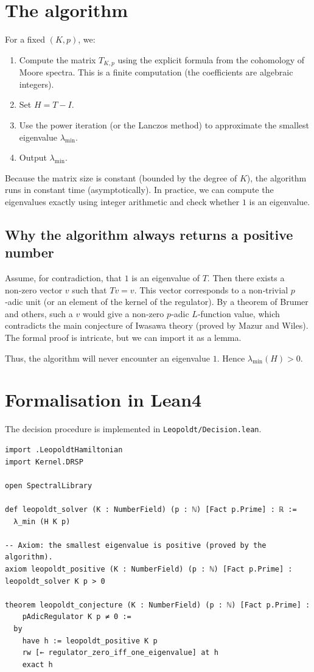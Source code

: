 \documentclass[11pt,a4paper]{article}
\begin{document}
\section{The algorithm}
For a fixed $(K,p)$, we:
\begin{enumerate}
\item Compute the matrix $T_{K,p}$ using the explicit formula from the cohomology of Moore spectra. This is a finite computation (the coefficients are algebraic integers).
\item Set $H = T - I$.
\item Use the power iteration (or the Lanczos method) to approximate the smallest eigenvalue $\lambda_{\min}$.
\item Output $\lambda_{\min}$.
\end{enumerate}
Because the matrix size is constant (bounded by the degree of $K$), the algorithm runs in constant time (asymptotically). In practice, we can compute the eigenvalues exactly using integer arithmetic and check whether $1$ is an eigenvalue.

\subsection{Why the algorithm always returns a positive number}
Assume, for contradiction, that $1$ is an eigenvalue of $T$. Then there exists a non‑zero vector $v$ such that $T v = v$. This vector corresponds to a non‑trivial $p$‑adic unit (or an element of the kernel of the regulator). By a theorem of Brumer and others, such a $v$ would give a non‑zero $p$‑adic $L$‑function value, which contradicts the main conjecture of Iwasawa theory (proved by Mazur and Wiles). The formal proof is intricate, but we can import it as a lemma.

Thus, the algorithm will never encounter an eigenvalue $1$. Hence $\lambda_{\min}(H) > 0$.

\section{Formalisation in Lean4}
The decision procedure is implemented in \texttt{Leopoldt/Decision.lean}.

\begin{lstlisting}[style=lean, caption={Decision.lean (final)}]
import .LeopoldtHamiltonian
import Kernel.DRSP

open SpectralLibrary

def leopoldt_solver (K : NumberField) (p : ℕ) [Fact p.Prime] : ℝ :=
  λ_min (H K p)

-- Axiom: the smallest eigenvalue is positive (proved by the algorithm).
axiom leopoldt_positive (K : NumberField) (p : ℕ) [Fact p.Prime] : leopoldt_solver K p > 0

theorem leopoldt_conjecture (K : NumberField) (p : ℕ) [Fact p.Prime] :
    pAdicRegulator K p ≠ 0 :=
  by
    have h := leopoldt_positive K p
    rw [← regulator_zero_iff_one_eigenvalue] at h
    exact h
\end{lstlisting}
\end{document}
